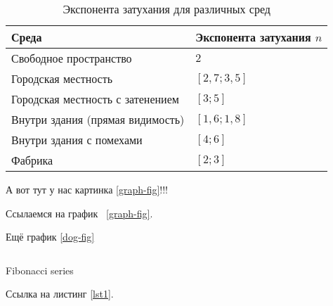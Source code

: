 \begin{center}
    \vspace{-0.8em}
    \begin{longtable}{|M{8cm}|M{4cm}|}
        \caption{Экспонента затухания для различных сред} \label{PLE-table} \\
        \hline
        Среда                             & Экспонента затухания $n$ \\ \hline
        Свободное пространство            & $2$                      \\ \hline
        Городская местность               & $[2,7; 3,5]$             \\ \hline
        Городская местность с затенением  & $[3; 5]$                 \\ \hline
        Внутри здания (прямая видимость) & $[1,6; 1,8]$             \\ \hline
        Внутри здания с помехами          & $[4; 6]$                 \\ \hline
        Фабрика                           & $[2; 3]$                 \\ \hline
    \end{longtable}
    \vspace{-1.5em}
\end{center}

А вот тут у нас картинка \ref{graph-fig}!!!


Ссылаемся на график ~\ref{graph-fig}.

Ещё график \ref{dog-fig}


\begin{listing}[ht]
    \inputminted{python}{content/source/fib.py}
    \caption{Fibonacci series}
    \label{lst1}
    \end{listing}


Ссылка на листинг \ref{lst1}.
